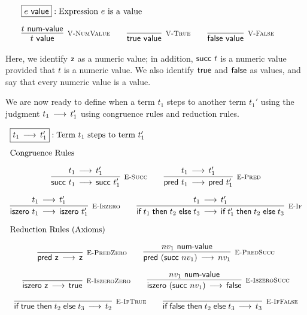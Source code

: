 \[
\begin{array}{c}
\multicolumn{1}{l}{\fbox{$e \Value$}: \mbox{Expression $e$ is a value}}\\[1em]
\infer[\VNumValue]{t \Value}{t \NumValue} \qquad
\infer[\VTrue]{\tmtrue \Value}{} \qquad
\infer[\VFalse]{\tmfalse \Value}{} \qquad
\end{array}
\]

Here, we identify $\textsf{z}$ as a numeric value; in addition, $\textsf{succ}~t$ is a
numeric value provided that $t$ is a numeric value. We also identify $\textsf{true}$
and $\textsf{false}$ as values, and say that every numeric value is a value.

We are now ready to define when a term $t_1$ steps to another term $t_1'$ using
the judgment $t_1 \mathrel{\,\longrightarrow\,} t_1'$ using congruence rules and reduction rules.

\[
\begin{array}{c}
\multicolumn{1}{l}{\fbox{$t_1 \Steps t_1'$}: \mbox{Term $t_1$ steps to term $t_1'$}}
\\[1em]
\multicolumn{1}{l}{\mbox{\text{Congruence Rules}}}
\\[1em]
\infer[\ESucc]{\tmsucc t_1 \Steps \tmsucc t_1'}{t_1 \Steps t_1'}\qquad
\infer[\EPred]{\tmpred t_1 \Steps \tmpred t_1'}{t_1 \Steps t_1'}
\\[1em]
\infer[\EIsZero]{\tmiszero t_1 \Steps \tmiszero t_1'}{t_1 \Steps t_1'}\qquad
\infer[\EIf]{\tmif{t_1}{t_2}{t_3} \Steps \tmif{t_1'}{t_2}{t_3}}{t_1 \Steps t_1'}
\\[1em]
\multicolumn{1}{l}{\mbox{\text{Reduction Rules (Axioms)}}}
\\[1em]
\infer[\EPredZ]{\tmpred \tmzero \Steps \tmzero}{}\qquad
\infer[\EPredSucc]{\tmpred (\tmsucc nv_1) \Steps nv_1}{nv_1 \NumValue}
\\[1em]
\infer[\EIsZeroZ]{\tmiszero \tmzero \Steps \tmtrue}{} \qquad
\infer[\EIsZeroSucc]{\tmiszero (\tmsucc nv_1) \Steps \tmfalse}{nv_1 \NumValue}
\\[1em]
\infer[\EIfT]{\tmif \tmtrue {t_2}{t_3} \Steps t_2}{}\qquad
\infer[\EIfF]{\tmif \tmfalse {t_2}{t_3} \Steps t_3}{}
\end{array}
\]

